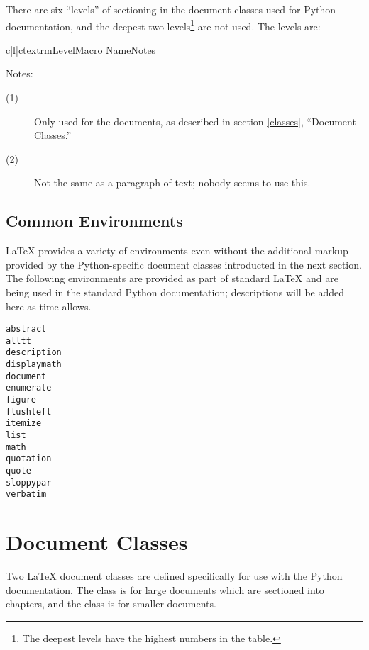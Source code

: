 \documentclass{howto}
\begin{document}
    There are six ``levels'' of sectioning in the document classes
    used for Python documentation, and the deepest two
    levels\footnote{The deepest levels have the highest numbers in the
      table.} are not used.  The levels are:

      \begin{tableiii}{c|l|c}{textrm}{Level}{Macro Name}{Notes}
      \end{tableiii}

    \noindent
    Notes:

    \begin{description}
      \item[(1)]
      Only used for the  documents, as described in
      section \ref{classes}, ``Document Classes.''
      \item[(2)]
      Not the same as a paragraph of text; nobody seems to use this.
    \end{description}


  \subsection{Common Environments \label{latex-environments}}

    \LaTeX{} provides a variety of environments even without the
    additional markup provided by the Python-specific document classes
    introducted in the next section.  The following environments are
    provided as part of standard \LaTeX{} and are being used in the
    standard Python documentation; descriptions will be added here as
    time allows.

\begin{verbatim}
abstract
alltt
description
displaymath
document
enumerate
figure
flushleft
itemize
list
math
quotation
quote
sloppypar
verbatim
\end{verbatim}


\section{Document Classes \label{classes}}

  Two \LaTeX{} document classes are defined specifically for use with
  the Python documentation.  The  class is for large
  documents which are sectioned into chapters, and the 
  class is for smaller documents.
\end{document}
